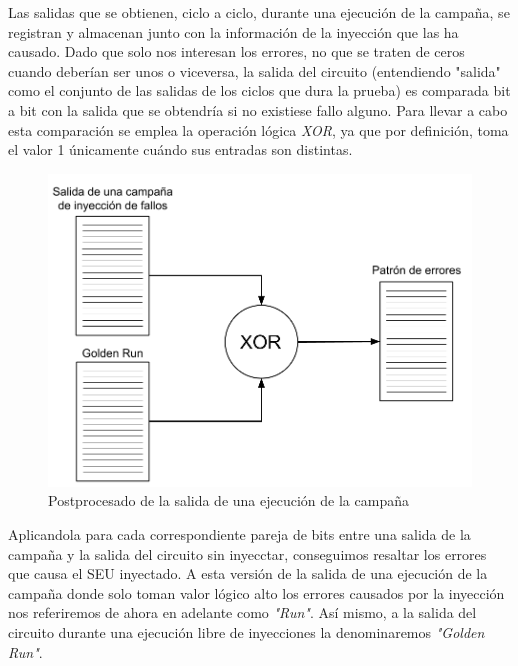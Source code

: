 Las salidas que se obtienen, ciclo a ciclo, durante una ejecución de la campaña, 
se registran y almacenan junto con la información de la inyección que las ha 
causado. Dado que solo nos interesan los errores, no que se traten de ceros cuando
deberían ser unos o viceversa, la salida del circuito (entendiendo "salida" como 
el conjunto de las salidas de los ciclos que dura la prueba) es comparada bit a 
bit con la salida que se obtendría si no existiese fallo alguno. Para llevar a 
cabo esta comparación se emplea la operación lógica \textit{XOR}, ya que por
definición, toma el valor 1 únicamente cuándo sus entradas son distintas.

\begin{figure}[htbp]
    \centering
    \includegraphics[width=0.95\linewidth]
    {InyeccionDeFallos/figuras/fig_2.png}
    \caption{Postprocesado de la salida de una ejecución de la campaña}
    \label{fig:PostprocesadoSalida}
\end{figure}

Aplicandola para cada correspondiente pareja de bits entre una salida de la 
campaña y la salida del circuito sin inyecctar, conseguimos resaltar los errores
que causa el \gls{SEU} inyectado. A esta versión de la salida de una ejecución de
la campaña donde solo toman valor lógico alto los errores causados por la
inyección nos referiremos de ahora en adelante como \textit{"Run"}. Así mismo, a 
la salida del circuito durante una ejecución libre de inyecciones la denominaremos
\textit{"Golden Run"}.


